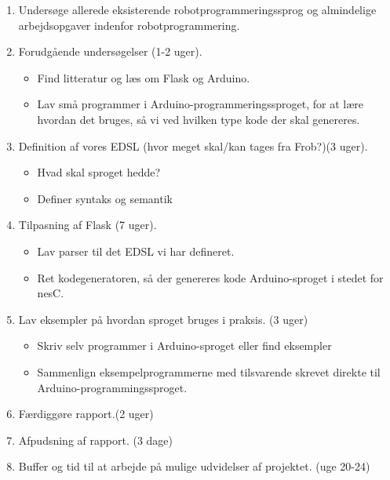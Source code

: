 \documentclass[a4paper,oneside, draft]{memoir}
\begin{document}
\begin{enumerate}

\item Undersøge allerede eksisterende robotprogrammeringssprog og almindelige
  arbejdsopgaver indenfor robotprogrammering.

\item Forudgående undersøgelser (1-2 uger).
  
  \begin{itemize}
  \item Find litteratur og læs om Flask og Arduino.
  \item Lav små programmer i Arduino-programmeringssproget, for at
    lære hvordan det bruges, så vi ved hvilken type kode der skal genereres.    
  \end{itemize}

\item Definition af vores EDSL (hvor meget skal/kan tages fra
  Frob?)(3 uger).   \label{item:opgaver:definer-syntaks}
  \begin{itemize}
  \item Hvad skal sproget hedde?
  \item Definer syntaks og semantik
  \end{itemize}

\item Tilpasning af Flask (7 uger).
  \begin{itemize}
  \item Lav parser til det EDSL vi har defineret.
  \item Ret kodegeneratoren, så der genereres kode Arduino-sproget i
    stedet for nesC.
  \end{itemize}


\item Lav eksempler på hvordan sproget bruges i praksis. (3 uger)
  \label{item:opgaver:lav-eksempler}

  \begin{itemize}
  \item Skriv selv programmer i Arduino-sproget eller find eksempler
  \item Sammenlign eksempelprogrammerne med tilsvarende skrevet direkte til
    Arduino-programmingssproget.  
  \end{itemize}
    
\item Færdiggøre rapport.(2 uger)
  
\item Afpudsning af rapport. (3 dage)
  
\item Buffer og tid til at arbejde på mulige udvidelser af projektet. (uge 20-24)
\end{enumerate}
\end{document}
